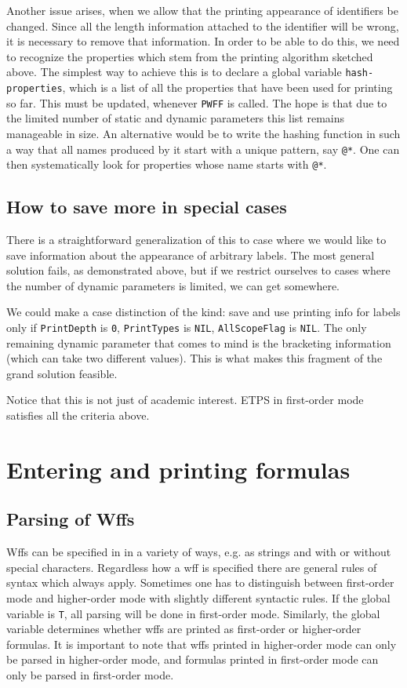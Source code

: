 Another issue arises, when we allow that the printing appearance of
identifiers be changed.  Since all
the length information attached to the identifier will be wrong, it
is necessary to remove that information.  In order to be able to do
this, we need to recognize the properties which stem from the printing
algorithm sketched above. The simplest way to achieve this is to
declare a global variable {\tt hash-properties}, which is a list
of all the properties that have been used for printing so far.  This
must be updated, whenever {\tt PWFF} is called.  The hope is that due to
the limited number of static and dynamic parameters this list remains
manageable in size.  An alternative would be to write the hashing
function in such a way that all names produced by it start with
a unique pattern, say {\tt *@*}.  One can then systematically
look for properties whose name starts with {\tt *@*}.

\subsection{How to save more in special cases}
There is a straightforward generalization of this to case where we would
like to save information about the appearance of arbitrary labels.  The most
general solution fails, as demonstrated above, but if we restrict ourselves
to cases where the number of dynamic parameters is limited, we can get
somewhere.

We could make a case distinction of the kind:  save and use printing
info for labels only if {\tt PrintDepth} is {\tt 0}, {\tt PrintTypes} is {\tt NIL},
{\tt AllScopeFlag} is {\tt NIL}.  The only remaining dynamic parameter that
comes to mind is the bracketing information (which can take two different
values).  This is what makes this fragment of the grand solution
feasible.

Notice that this is not just of academic interest.  ETPS in first-order
mode satisfies all the criteria above.

\section{Entering and printing formulas}

\subsection{Parsing of Wffs}
Wffs can be specified in \TPS in a variety of ways, e.g. as strings
and with or without special characters.  Regardless how
a wff is specified there are general rules of syntax which always apply.
Sometimes one has to distinguish between first-order mode and higher-order
mode with slightly different syntactic rules.  If the global variable
 is {\tt T}, all parsing will be done
in first-order mode.  Similarly, the global variable
 determines whether wffs are
printed as first-order or higher-order formulas.  It is important
to note that wffs printed in higher-order mode can only be parsed in 
higher-order mode, and formulas  printed in first-order mode can only be
parsed in first-order mode.

